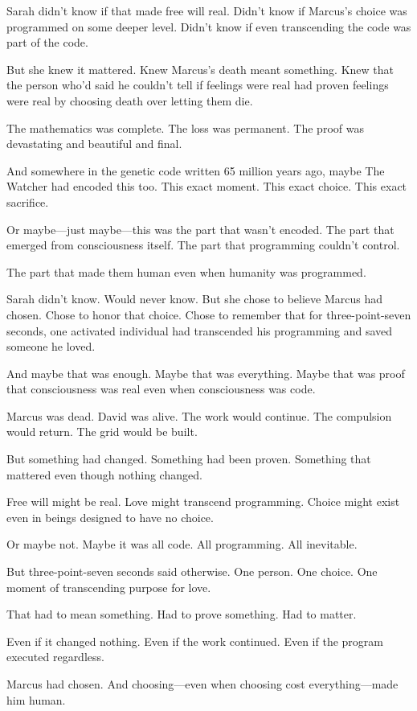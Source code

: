 Sarah didn't know if that made free will real. Didn't know if Marcus's choice was programmed on some deeper level. Didn't know if even transcending the code was part of the code.

But she knew it mattered. Knew Marcus's death meant something. Knew that the person who'd said he couldn't tell if feelings were real had proven feelings were real by choosing death over letting them die.

The mathematics was complete. The loss was permanent. The proof was devastating and beautiful and final.

And somewhere in the genetic code written 65 million years ago, maybe The Watcher had encoded this too. This exact moment. This exact choice. This exact sacrifice.

Or maybe—just maybe—this was the part that wasn't encoded. The part that emerged from consciousness itself. The part that programming couldn't control.

The part that made them human even when humanity was programmed.

Sarah didn't know. Would never know. But she chose to believe Marcus had chosen. Chose to honor that choice. Chose to remember that for three-point-seven seconds, one activated individual had transcended his programming and saved someone he loved.

And maybe that was enough. Maybe that was everything. Maybe that was proof that consciousness was real even when consciousness was code.

Marcus was dead. David was alive. The work would continue. The compulsion would return. The grid would be built.

But something had changed. Something had been proven. Something that mattered even though nothing changed.

Free will might be real. Love might transcend programming. Choice might exist even in beings designed to have no choice.

Or maybe not. Maybe it was all code. All programming. All inevitable.

But three-point-seven seconds said otherwise. One person. One choice. One moment of transcending purpose for love.

That had to mean something. Had to prove something. Had to matter.

Even if it changed nothing. Even if the work continued. Even if the program executed regardless.

Marcus had chosen. And choosing—even when choosing cost everything—made him human.

